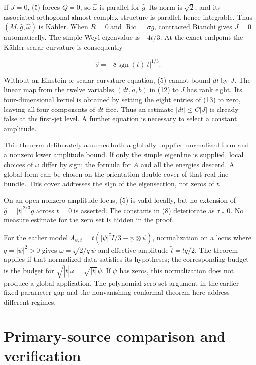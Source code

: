 \documentclass[
]{article}
\begin{document}
If \(J=0\), (5) forces \(Q=0\), so \(\widehat\omega\) is parallel for
\(\widehat g\). Its norm is \(\sqrt2\), and its associated orthogonal
almost complex structure is parallel, hence integrable. Thus
\((M,\widehat g,\widehat\omega)\) is Kähler. When \(R=0\) and
\(\operatorname{Ric}=\sigma g\), contracted Bianchi gives \(J=0\)
automatically. The simple Weyl eigenvalue is \(-4t/3\). At the exact
endpoint the Kähler scalar curvature is consequently

\[
 \widehat s=-8\operatorname{sgn}(t)|t|^{1/3}.
 \tag{22}
\]

Without an Einstein or scalar-curvature equation, (5) cannot bound
\(dt\) by \(J\). The linear map from the twelve variables \((dt,a,b)\)
in (12) to \(J\) has rank eight. Its four-dimensional kernel is obtained
by setting the eight entries of (13) to zero, leaving all four
components of \(dt\) free. Thus an estimate \(|dt|\le C|J|\) is already
false at the first-jet level. A further equation is necessary to select
a constant amplitude.

This theorem deliberately assumes both a globally supplied normalized
form and a nonzero lower amplitude bound. If only the simple eigenline
is supplied, local choices of \(\omega\) differ by sign; the formula for
\(A\) and all the energies descend. A global form can be chosen on the
orientation double cover of that real line bundle. This cover addresses
the sign of the eigensection, not zeros of \(t\).

On an open nonzero-amplitude locus, (5) is valid locally, but no
extension of \(\widehat g=|t|^{2/3}g\) across \(t=0\) is asserted. The
constants in (8) deteriorate as \(\tau\downarrow0\). No measure estimate
for the zero set is hidden in the proof.

For the earlier model \(A_{\psi,t}=t(|\psi|^2I/3-\psi\otimes\psi)\),
normalization on a locus where \(q=|\psi|^2>0\) gives
\(\omega=\sqrt{2/q}\,\psi\) and effective amplitude
\(\widetilde t=tq/2\). The theorem applies if that normalized data
satisfies its hypotheses; the corresponding budget is the budget for
\(\sqrt{|\widetilde t|}\omega=\sqrt{|t|}\psi\). If \(\psi\) has zeros,
this normalization does not produce a global application. The polynomial
zero-set argument in the earlier fixed-parameter gap and the
nonvanishing conformal theorem here address different regimes.

\hypertarget{primary-source-comparison-and-verification}{%
\section{Primary-source comparison and
verification}\label{primary-source-comparison-and-verification}}
\end{document}
